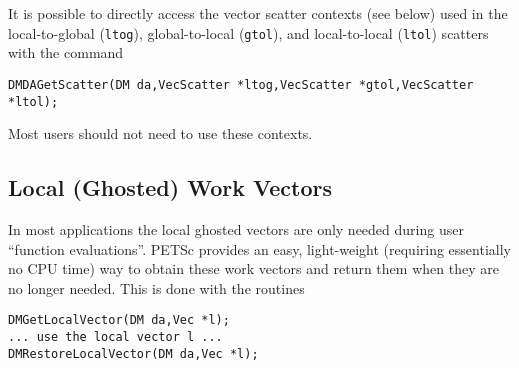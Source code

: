 It is possible to directly access the vector scatter contexts (see below)
used in the local-to-global (\lstinline{ltog}), global-to-local
(\lstinline{gtol}), and local-to-local (\lstinline{ltol})
scatters with the command
\begin{lstlisting}
DMDAGetScatter(DM da,VecScatter *ltog,VecScatter *gtol,VecScatter *ltol);
\end{lstlisting}
Most users should not need to use these contexts.

\subsection{Local (Ghosted) Work Vectors}
In most applications the local ghosted vectors are only needed during user
``function evaluations''. PETSc provides an easy, light-weight (requiring
essentially no CPU time) way to obtain these work vectors and return them when
they are no longer needed. This is done with the routines
\begin{lstlisting}
DMGetLocalVector(DM da,Vec *l);
... use the local vector l ...
DMRestoreLocalVector(DM da,Vec *l);
\end{lstlisting}

